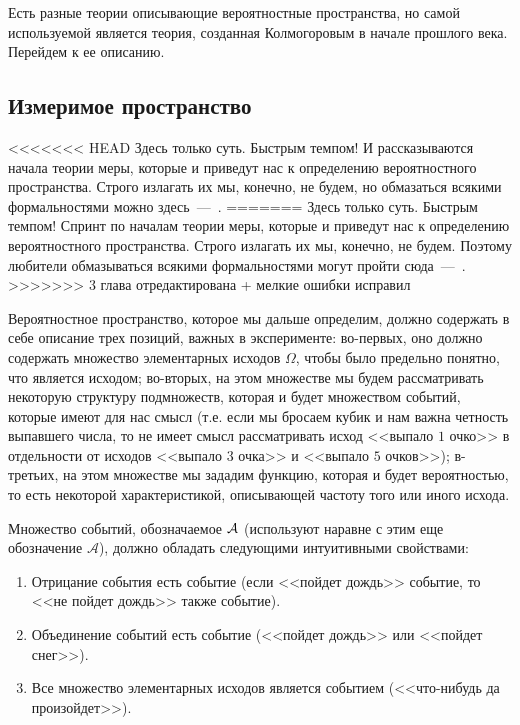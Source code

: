\documentclass[../TV&MS.tex]{subfiles}
\begin{document}
Есть разные теории описывающие вероятностные пространства, но самой используемой является 
теория, созданная Колмогоровым в начале прошлого века. Перейдем к ее описанию.

\subsection{Измеримое пространство}
	
<<<<<<< HEAD
\qquad Здесь только суть. Быстрым темпом! И рассказываются начала теории меры,
которые и приведут нас к определению вероятностного пространства. Строго излагать их мы, конечно, не будем, но обмазаться всякими формальностями можно здесь~---~\cite{Gusev}.
=======
\qquad Здесь только суть. Быстрым темпом! Спринт по началам теории меры,
которые и приведут нас к определению вероятностного пространства. 
Строго излагать их мы, конечно, не будем. Поэтому любители обмазываться всякими 
формальностями могут пройти сюда~---~\cite{Gusev}.
>>>>>>> 3 глава отредактирована + мелкие ошибки исправил

Вероятностное пространство, которое мы дальше определим, должно 
содержать в себе описание трех позиций, важных в эксперименте: 
во-первых, оно должно содержать множество элементарных исходов $\Omega$,
чтобы было предельно понятно, что является исходом; во-вторых,
на этом множестве мы будем рассматривать некоторую структуру подмножеств,
которая и будет множеством событий, которые имеют для нас смысл (т.е.
если мы бросаем кубик и нам важна четность выпавшего числа, то не имеет
смысл рассматривать исход <<выпало $1$ очко>> в отдельности от исходов 
<<выпало $3$ очка>> и <<выпало $5$ очков>>); в-третьих, на этом множестве мы 
зададим функцию, которая и будет вероятностью, то есть некоторой 
характеристикой, описывающей частоту того или иного исхода.

Множество событий, обозначаемое $\mathcal{A}$ (используют наравне с этим еще обозначение 
$\mathscr{A}$), должно обладать следующими интуитивными свойствами:
\begin{enumerate}
	\item Отрицание события есть событие (если <<пойдет дождь>> событие, 
	то <<не пойдет дождь>> также событие).
	\item Объединение событий есть событие (<<пойдет дождь>> или <<пойдет снег>>).
	\item Все множество элементарных исходов является событием (<<что-нибудь да произойдет>>).
\end{enumerate}
\end{document}

